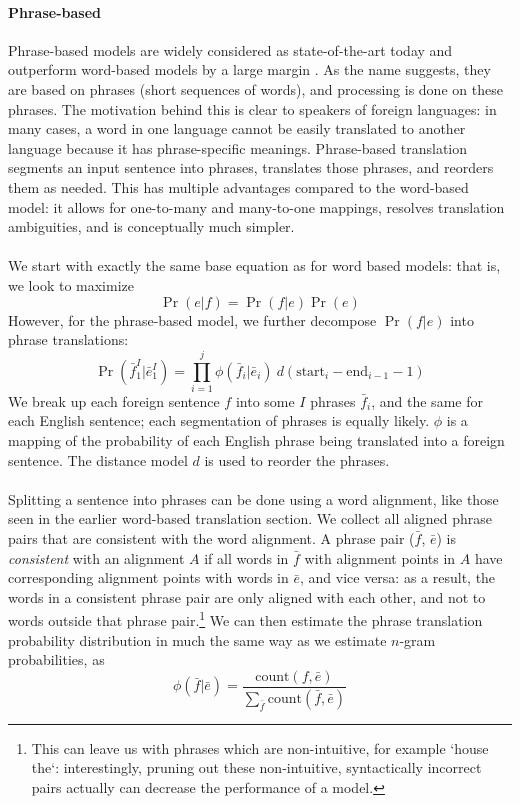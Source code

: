  \paragraph{Phrase-based}{Phrase-based models are widely considered as
   state-of-the-art today \cite{smt} and outperform word-based models
   by a large margin \cite{koehn}. As the name suggests, they are
   based on phrases (short sequences of words), and processing is done
   on these phrases. The motivation behind this is clear to speakers
   of foreign languages: in many cases, a word in one language cannot
   be easily translated to another language because it has
   phrase-specific meanings. Phrase-based translation segments an
   input sentence into phrases, translates those phrases, and reorders
   them as needed. This has multiple advantages compared to the
   word-based model: it allows for one-to-many and many-to-one
   mappings, resolves translation ambiguities, and is conceptually
   much simpler. \cite{smt}}
 \paragraph{}{We start with exactly the same base equation as for word
   based models: that is, we look to maximize
   $$ \Pr(e|f) = \Pr(f|e)\Pr(e)$$ However, for the phrase-based model,
   we further decompose $\Pr(f|e)$ into phrase translations\cite{smt}:
   $$ \Pr(\bar{f}_1^I | \bar{e}_1^I)  =
   \prod_{i=1}^j \phi(\bar{f}_i | \bar{e}_i) \ d(\text{start}_i -
   \text{end}_{i-1} - 1)$$ We break up each foreign sentence $f$ into
   some $I$ phrases $\bar{f}_i$, and the same for each English
   sentence; each segmentation of phrases is equally likely. $\phi$ is
   a mapping of the probability of each English phrase being
   translated into a foreign sentence. The distance model $d$ is used
   to reorder the phrases.}
 \paragraph{}{Splitting a sentence into phrases can be done using a
   word alignment, like those seen in the earlier word-based
   translation section. We collect all aligned phrase pairs that are
   consistent with the word alignment. A phrase pair ($\bar{f}$,
   $\bar{e}$) is {\it consistent} with an alignment $A$ if all words
   in $\bar{f}$ with alignment points in $A$ have corresponding
   alignment points with words in $\bar{e}$, and vice versa: as a
   result, the words in a consistent phrase pair are only aligned with
   each other, and not to words outside that phrase
   pair.\footnote{This can leave us with phrases which are
     non-intuitive, for example `house the`: interestingly, pruning
     out these non-intuitive, syntactically incorrect pairs actually
     can decrease the performance of a model.\cite{koehn}} We can then
   estimate the phrase translation probability distribution in much
   the same way as we estimate $n$-gram probabilities, as
   $$ \phi(\bar{f} | \bar{e}) =
   \frac{\text{count}(f, \bar{e})}
   {\sum_{\bar{f}}\text{count}(\bar{f}, \bar{e})}$$ }
